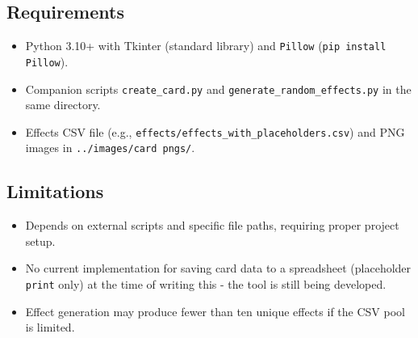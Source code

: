 \subsection{Requirements}
\begin{itemize}
	\item Python 3.10+ with Tkinter (standard library) and \texttt{Pillow} (\texttt{pip install Pillow}).
	\item Companion scripts \texttt{create\_card.py} and \texttt{generate\_random\_effects.py} in the same directory.
	\item Effects CSV file (e.g., \texttt{effects/effects\_with\_placeholders.csv}) and PNG images in \texttt{../images/card pngs/}.
\end{itemize}

\subsection{Limitations}
\begin{itemize}
	\item Depends on external scripts and specific file paths, requiring proper project setup.
	\item No current implementation for saving card data to a spreadsheet (placeholder \texttt{print} only) at the time of writing this - the tool is still being developed.
	\item Effect generation may produce fewer than ten unique effects if the CSV pool is limited.
\end{itemize}
